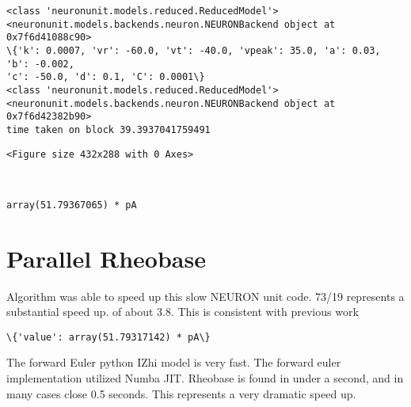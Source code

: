     \begin{Verbatim}[commandchars=\\\{\}]
<class 'neuronunit.models.reduced.ReducedModel'>
<neuronunit.models.backends.neuron.NEURONBackend object at 0x7f6d41088c90>
\{'k': 0.0007, 'vr': -60.0, 'vt': -40.0, 'vpeak': 35.0, 'a': 0.03, 'b': -0.002,
'c': -50.0, 'd': 0.1, 'C': 0.0001\}
<class 'neuronunit.models.reduced.ReducedModel'>
<neuronunit.models.backends.neuron.NEURONBackend object at 0x7f6d42382b90>
time taken on block 39.3937041759491
    \end{Verbatim}

    
    \begin{verbatim}
<Figure size 432x288 with 0 Axes>
    \end{verbatim}

    
    \begin{center}
    \end{center}
    { \hspace*{\fill} \\}
    
            \begin{tcolorbox}[breakable, size=fbox, boxrule=.5pt, pad at break*=1mm, opacityfill=0]
\begin{Verbatim}[commandchars=\\\{\}]
array(51.79367065) * pA
\end{Verbatim}
\end{tcolorbox}
        
    \hypertarget{parallel-rheobase}{%
\section{Parallel Rheobase}\label{parallel-rheobase}}

Algorithm was able to speed up this slow NEURON unit code. 73/19
represents a substantial speed up. of about 3.8. This is consistent with
previous work

            \begin{tcolorbox}[breakable, size=fbox, boxrule=.5pt, pad at break*=1mm, opacityfill=0]
\begin{Verbatim}[commandchars=\\\{\}]
\{'value': array(51.79317142) * pA\}
\end{Verbatim}
\end{tcolorbox}
        
    The forward Euler python IZhi model is very fast. The forward euler
implementation utilized Numba JIT. Rheobase is found in under a second,
and in many cases close 0.5 seconds. This represents a very dramatic
speed up.

